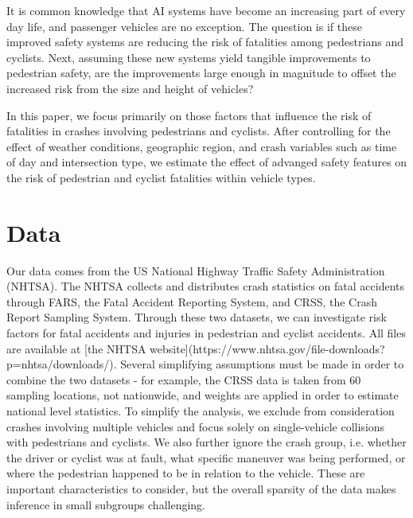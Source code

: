 \documentclass[12pt]{article}
\begin{document}
It is common knowledge that AI systems have become an increasing part of every day life, and passenger
vehicles are no exception. The question is if these improved safety systems are reducing the risk of fatalities
among pedestrians and cyclists. Next, assuming these new systems yield tangible improvements to pedestrian safety,
are the improvements large enough in magnitude to offset the increased risk from the size and height of vehicles?

In this paper, we focus primarily on those factors that influence the risk of fatalities in crashes involving pedestrians
and cyclists. After controlling for the effect of weather conditions,
geographic region, and crash variables such as time of day and intersection type, we estimate the effect
of advanged safety features on the risk of pedestrian and cyclist fatalities within vehicle types.


\section{Data}

Our data comes from the US National Highway Traffic Safety Administration (NHTSA). The NHTSA collects and distributes
crash statistics on fatal accidents through FARS, the Fatal Accident Reporting System, and CRSS, the Crash Report
Sampling System. Through these two datasets, we can investigate risk factors for fatal accidents and injuries in
pedestrian and cyclist accidents. All files are available at
[the NHTSA website](https://www.nhtsa.gov/file-downloads?p=nhtsa/downloads/). Several simplifying assumptions must be
made in order to combine the two datasets - for example, the CRSS data is taken from 60 sampling locations, not
nationwide, and weights are applied in order to estimate national level
statistics\cite{national_highway_traffic_safety_administration_crash_nodate}.  To simplify the analysis, we exclude
from consideration crashes involving multiple vehicles and focus solely on single-vehicle collisions with pedestrians
and cyclists. We also further ignore the crash group, i.e. whether the driver or cyclist was at fault, what
specific maneuver was being performed, or where the pedestrian happened to be in relation to the vehicle. These are
important characteristics to consider, but the overall sparsity of the data makes inference in small subgroups
challenging.

\end{document}
